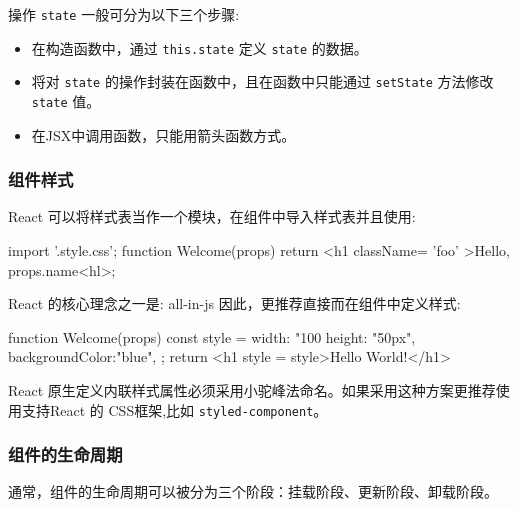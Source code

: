 操作 \texttt{state} 一般可分为以下三个步骤:
\begin{itemize}
  \item 在构造函数中，通过 \texttt{this.state} 定义 \texttt{state} 的数据。
  \item 将对 \texttt{state} 的操作封装在函数中，且在函数中只能通过 \texttt{setState} 方法修改 \texttt{state} 值。
  \item 在JSX中调用函数，只能用箭头函数方式。
\end{itemize}

\subsubsection{组件样式}

React 可以将样式表当作一个模块，在组件中导入样式表并且使用:

\begin{JavaScript}
import '.style.css’;
function Welcome(props) { 
  return <h1 className= 'foo' >Hello, {props.name}<hl>;
} 
\end{JavaScript}

React 的核心理念之一是: all-in-js 因此，更推荐直接而在组件中定义样式:

\begin{JavaScript}
function Welcome(props) {
  const style = {
    width: "100%
    height: "50px",
    backgroundColor:"blue",
  };
  return <h1 style = {style}>Hello World!</h1>
}
\end{JavaScript}

React 原生定义内联样式属性必须采用小驼峰法命名。如果采用这种方案更推荐使用支持React 的 CSS框架,比如 \texttt{\texttt{styled-component}}。

\subsubsection{组件的生命周期}

通常，组件的生命周期可以被分为三个阶段：挂载阶段、更新阶段、卸载阶段。


